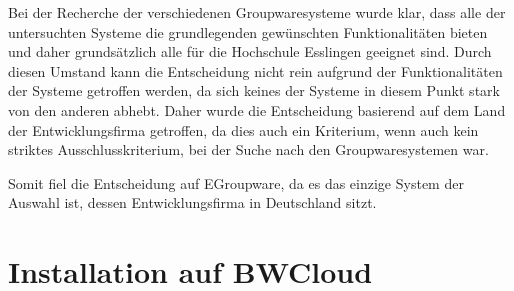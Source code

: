 Bei der Recherche der verschiedenen Groupwaresysteme wurde klar, dass alle der untersuchten Systeme die grundlegenden gewünschten Funktionalitäten bieten und daher grundsätzlich alle für die Hochschule Esslingen geeignet sind.
Durch diesen Umstand kann die Entscheidung nicht rein aufgrund der Funktionalitäten der Systeme getroffen werden, da sich keines der Systeme in diesem Punkt stark von den anderen abhebt.
Daher wurde die Entscheidung basierend auf dem Land der Entwicklungsfirma getroffen, da dies auch ein Kriterium, wenn auch kein striktes Ausschlusskriterium, bei der Suche nach den Groupwaresystemen war.

Somit fiel die Entscheidung auf EGroupware, da es das einzige System der Auswahl ist, dessen Entwicklungsfirma in Deutschland sitzt.


\section{Installation auf BWCloud}

